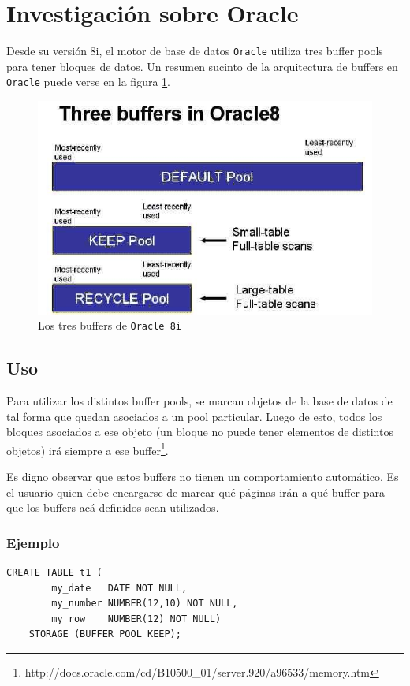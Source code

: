 \section{Investigación sobre Oracle}

Desde su versión 8i, el motor de base de datos \texttt{Oracle} utiliza tres buffer pools para tener bloques de datos. Un resumen sucinto de la arquitectura de buffers
en \texttt{Oracle} puede verse en la figura \ref{fotito}.

\begin{figure}[H]\centering
	\includegraphics[scale=0.5]{keepRecycle.jpg}
	\caption{Los tres buffers de \texttt{Oracle 8i}}
	\label{fotito}
\end{figure}
\subsection{Uso}
Para utilizar los distintos buffer pools, se marcan objetos de la base de datos de tal forma que quedan asociados a un pool particular. Luego de esto, todos los bloques asociados a ese objeto (un bloque no puede tener elementos de distintos objetos) irá siempre a ese buffer\footnote{http://docs.oracle.com/cd/B10500\_01/server.920/a96533/memory.htm}. 

Es digno observar que estos buffers no tienen un comportamiento automático. Es el usuario quien debe encargarse de marcar qué páginas irán a qué buffer para que los buffers acá definidos sean utilizados. 

\subsubsection{Ejemplo}
\begin{Verbatim}[xleftmargin=-3em]
	CREATE TABLE t1 (
		my_date   DATE NOT NULL,
		my_number NUMBER(12,10) NOT NULL,
		my_row    NUMBER(12) NOT NULL)
	STORAGE (BUFFER_POOL KEEP);	
\end{Verbatim}

